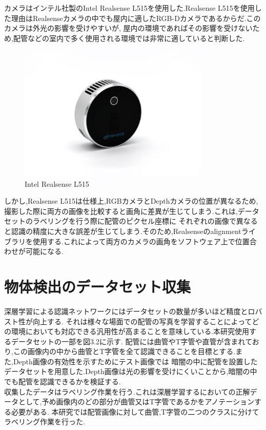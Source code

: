 カメラはインテル社製のIntel Realsense L515を使用した.Realsense L515を使用した理由はRealsenseカメラの中でも屋内に適したRGB-Dカメラであるからだ.このカメラは外光の影響を受けやすいが,
屋内の環境であればその影響を受けないため,配管などの室内で多く使用される環境では非常に適していると判断した.
\begin{figure}[htbt]
    \centering
     \includegraphics[height=65mm]{realsense.eps}
     \caption{Intel Realsense L515}
     \label{fig:f2}
\end{figure}

しかし,Realsense L515は仕様上,RGBカメラとDepthカメラの位置が異なるため,撮影した際に両方の画像を比較すると画角に差異が生じてしまう.これは,データセットのラベリングを行う際に配管のピクセル座標に
それぞれの画像で異なると認識の精度に大きな誤差が生じてしまう.そのため,Realsenseのalignmentライブラリを使用する.これによって両方のカメラの画角をソフトウェア上で位置合わせが可能になる.

\section{物体検出のデータセット収集}
深層学習による認識ネットワークにはデータセットの数量が多いほど精度とロバスト性が向上する.
それは様々な場面での配管の写真を学習することによってどの環境においても対応できる汎用性が高まることを意味している.本研究使用するデータセットの一部を図3.2に示す.
配管には曲管やT字管や直管が含まれており,この画像内の中から曲管とT字管を全て認識できることを目標とする.また,Depth画像の有効性を示すためにテスト画像では
暗闇の中に配管を設置したデータセットを用意した.Depth画像は光の影響を受けにくいことから,暗闇の中でも配管を認識できるかを検証する.\\
収集したデータはラベリング作業を行う.これは深層学習するにおいての正解データとして,予め画像内のどの部分が曲管又はT字管であるかをアノテーションする必要がある.
本研究では配管画像に対して曲管,T字管の二つのクラスに分けてラベリング作業を行った.

